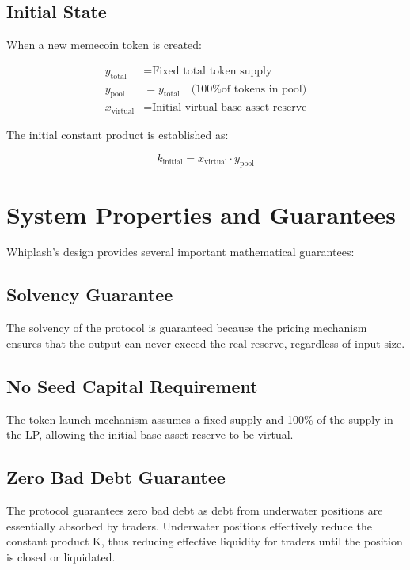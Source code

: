 \documentclass[11pt]{article}
\begin{document}
\subsection{Initial State}
When a new memecoin token is created:

\begin{equation}
\begin{aligned}
y_{\text{total}} &= \text{Fixed total token supply} \\
y_{\text{pool}} &= y_{\text{total}} \quad \text{(100\% of tokens in pool)} \\
x_{\text{virtual}} &= \text{Initial virtual base asset reserve}
\end{aligned}
\end{equation}

The initial constant product is established as:

\begin{equation}
k_{\text{initial}} = x_{\text{virtual}} \cdot y_{\text{pool}}
\end{equation}

\section{System Properties and Guarantees}

Whiplash's design provides several important mathematical guarantees:

\subsection{Solvency Guarantee}

The solvency of the protocol is guaranteed because the pricing mechanism ensures that the output can never exceed the real reserve, regardless of input size.

\subsection{No Seed Capital Requirement}

The token launch mechanism assumes a fixed supply and 100\% of the supply in the LP, allowing the initial base asset reserve to be virtual.

\subsection{Zero Bad Debt Guarantee}

The protocol guarantees zero bad debt as debt from underwater positions are essentially absorbed by traders. Underwater positions effectively reduce the constant product K, thus reducing effective liquidity for traders until the position is closed or liquidated.
\end{document}
